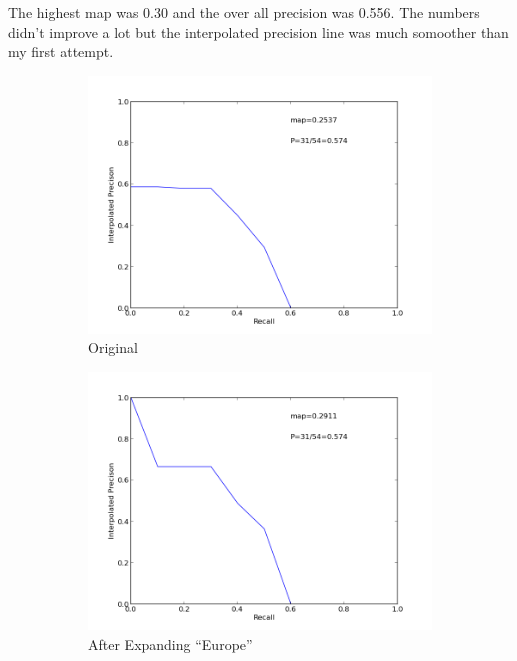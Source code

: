 \documentclass[11pt]{article} %
\begin{document}
The highest map was 0.30 and the over all precision was 0.556. The numbers didn't improve a lot but the interpolated precision line was much somoother than my first attempt.

\begin{figure}[p]
    \centering
    \begin{subfigure}{0.45\textwidth}
      \includegraphics[width=0.9\linewidth]{311/figure_1.png}
      \caption{Original}
    \end{subfigure}
    \begin{subfigure}{0.45\textwidth}
        \includegraphics[width=0.9\linewidth]{311/figure_2.png}
        \caption{After Expanding ``Europe''}
    \end{subfigure}
    \begin{subfigure}{0.45\textwidth}

\end{subfigure}
\end{figure}
\end{document}
